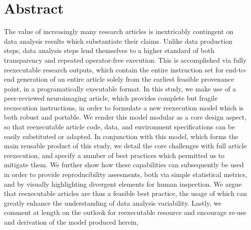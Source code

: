 \section{Abstract}

The value of increasingly many research articles is inextricably contingent on data analysis results which substantiate their claims.
Unlike data production steps, data analysis steps lend themselves to a higher standard of both transparency and repeated operator-free execution.
This is accomplished via fully reexecutable research outputs, which contain the entire instruction set for end-to-end generation of an entire article solely from the earliest feasible provenance point, in a programatically executable format.
In this study, we make use of a peer-reviewed neuroimaging article, which provides complete but fragile reexecution instructions, in order to formulate a new reexecution model which is both robust and portable.
We render this model modular as a core design aspect, so that reexecutable article code, data, and environment specifications can be easily substituted or adapted.
In conjunction with this model, which forms the main reusable product of this study, we detail the core challenges with full article reexecution, and specify a number of best practices which permitted us to mitigate them.
We further show how these capabilities can subsequently be used in order to provide reproducibility assesments, both via simple statistical metrics, and by visually highlighting divergent elements for human inspection.
We argue that reexecutable articles are thus a feasible best practice, the usage of which can greatly enhance the understanding of data analysis variability.
Lastly, we comment at length on the outlook for reexecutable resource and encourage re-use and derivation of the model produced herein, 


